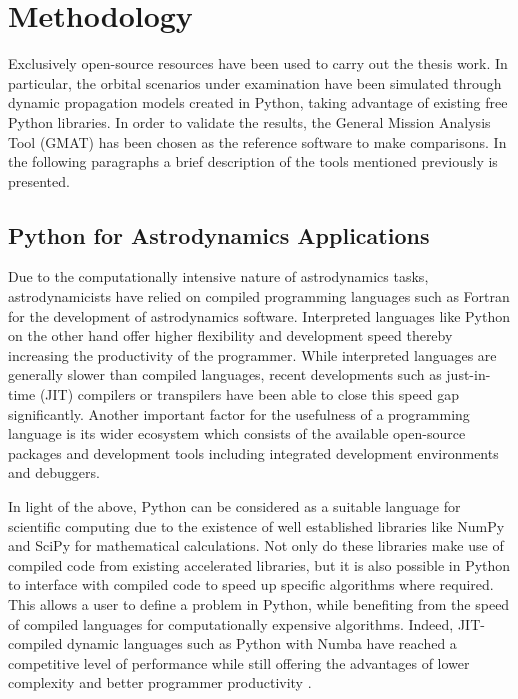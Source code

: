 \chapter{Methodology}

Exclusively open-source resources have been used to carry out the thesis work. 
In particular, the orbital scenarios under examination have been simulated through dynamic propagation models created in Python, taking advantage of existing free Python libraries.   
In order to validate the results, the General Mission Analysis Tool (GMAT) has been chosen as the reference software to make comparisons. 
In the following paragraphs a brief description of the tools mentioned previously is presented.

\section{Python for Astrodynamics Applications}

Due to the computationally intensive nature of astrodynamics tasks, astrodynamicists have relied on compiled programming languages such as Fortran for the development of astrodynamics software.
Interpreted languages like Python on the other hand offer higher flexibility and development speed thereby increasing the productivity of the programmer.
While interpreted languages are generally slower than compiled languages, recent developments such as just-in-time (JIT) compilers or transpilers have been able to close this speed gap significantly. 
Another important factor for the usefulness of a programming language is its wider ecosystem which consists of the available open-source packages and development tools including integrated development environments and debuggers. 

In light of the above, Python can be considered as a suitable language for scientific computing due to the existence of well established libraries like NumPy and SciPy for mathematical calculations.
Not only do these libraries make use of compiled code from existing accelerated libraries, but it is also possible in Python to interface with compiled code to speed up specific algorithms where required.
This allows a user to define a problem in Python, while benefiting from the speed of compiled languages for computationally expensive algorithms.
Indeed, JIT-compiled dynamic languages such as Python with Numba have reached a competitive level of performance while still offering the advantages of lower complexity and better programmer productivity
\cite{eichhorn2018comparative}.

